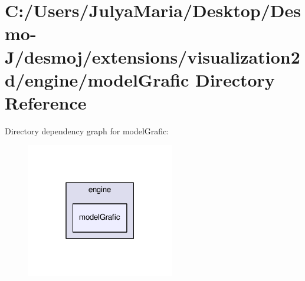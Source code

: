 \section{C\-:/\-Users/\-Julya\-Maria/\-Desktop/\-Desmo-\/\-J/desmoj/extensions/visualization2d/engine/model\-Grafic Directory Reference}
\label{dir_8986612a2ea1b4bfabae3b1cf0fe9fba}
Directory dependency graph for model\-Grafic\-:
\nopagebreak
\begin{figure}[H]
\begin{center}
\leavevmode
\includegraphics[width=182pt]{dir_8986612a2ea1b4bfabae3b1cf0fe9fba_dep}
\end{center}
\end{figure}
